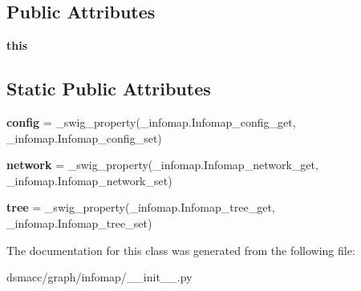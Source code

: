 \subsection*{Public Attributes}
\begin{DoxyCompactItemize}
\item 
\mbox{\label{classdsmacc_1_1graph_1_1infomap_1_1Infomap_a3765cf280d3f84d968275f709c798aae}} 
{\bfseries this}
\end{DoxyCompactItemize}
\subsection*{Static Public Attributes}
\begin{DoxyCompactItemize}
\item 
\mbox{\label{classdsmacc_1_1graph_1_1infomap_1_1Infomap_ac97d0a5fb1d045fcce71bfbb94719852}} 
{\bfseries config} = \+\_\+swig\+\_\+property(\+\_\+infomap.\+Infomap\+\_\+config\+\_\+get, \+\_\+infomap.\+Infomap\+\_\+config\+\_\+set)
\item 
\mbox{\label{classdsmacc_1_1graph_1_1infomap_1_1Infomap_af4b860e142c1e9bff8058e33ca8d0aad}} 
{\bfseries network} = \+\_\+swig\+\_\+property(\+\_\+infomap.\+Infomap\+\_\+network\+\_\+get, \+\_\+infomap.\+Infomap\+\_\+network\+\_\+set)
\item 
\mbox{\label{classdsmacc_1_1graph_1_1infomap_1_1Infomap_a7c39537e4287794981e2aa766bc90d8f}} 
{\bfseries tree} = \+\_\+swig\+\_\+property(\+\_\+infomap.\+Infomap\+\_\+tree\+\_\+get, \+\_\+infomap.\+Infomap\+\_\+tree\+\_\+set)
\end{DoxyCompactItemize}


The documentation for this class was generated from the following file\+:\begin{DoxyCompactItemize}
\item 
dsmacc/graph/infomap/\+\_\+\+\_\+init\+\_\+\+\_\+.\+py\end{DoxyCompactItemize}
